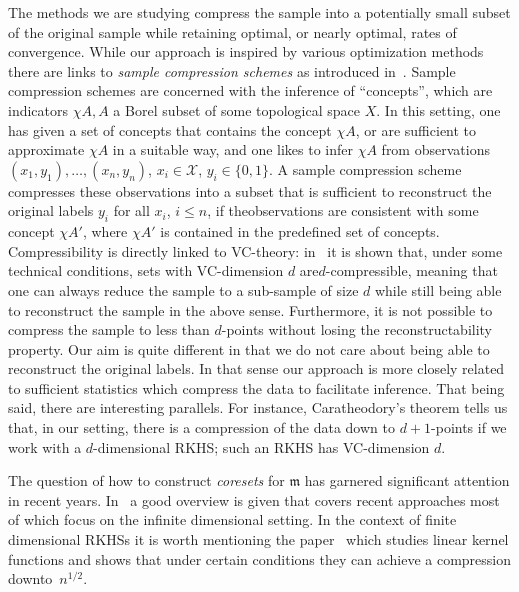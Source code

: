 \documentclass[10pt]{amsart}
\theoremstyle{definition}\newtheorem{defi}[theo]{Definition}\newtheorem{rema}[theo]{Remark}\newtheorem{exam}[theo]{Example}\newtheorem{exem}[theo]{Example}\newtheorem{nota}[theo]{Notation}
\theoremstyle{remark}
\newcommand{\X}{\mathcal{X}}
\newcommand{\mean}{\mathfrak{m}}
\begin{document}
The methods we are studying compress the sample into a potentially small subset of the original sample while retaining optimal, or nearly optimal, rates of convergence. While our approach is inspired by various optimization methods there are links to \emph{sample compression schemes} as introduced in~\cite{FLOYD95,LITTLE86}. Sample compression schemes are concerned with the inference of ``concepts'', which are indicators $\chi A, A$ a Borel subset of some topological space $X$. In this setting, one has given a set of concepts that contains the concept $\chi A$, or are sufficient to approximate $\chi A$ in a suitable way, and one likes to infer $\chi A$ from observations $(x_1,y_1), \dots, (x_n,y_n)$, $x_i \in \X$, $y_i \in \{0,1\}$. A sample compression scheme compresses these observations into a subset that is sufficient to reconstruct the original labels $y_i$ for all $x_i$, $i\leq n$, if the\linebreak observations are consistent with some concept $\chi A'$, where $\chi A'$ is contained in the predefined set of concepts. Compressibility is directly linked to VC-theory: in~\cite{FLOYD95} it is shown that, under some technical conditions, sets with VC-dimension $d$ are\linebreak $d$-compressible, meaning that one can always reduce the sample to a sub-sample of size $d$ while still being able to reconstruct the sample in the above sense. Furthermore, it is not possible to compress the sample to less than $d$-points without losing the reconstructability property. Our aim is quite different in that we do not care about being able to reconstruct the original labels. In that sense our approach is more closely related to sufficient statistics which compress the data to facilitate inference. That being said, there are interesting parallels. For instance, Caratheodory's theorem tells us that, in our setting, there is a compression of the data down to $d+1$-points if we work with a $d$-dimensional RKHS; such an RKHS has VC-dimension $d$.

The question of how to construct \emph{coresets} for $\mean$ has garnered significant attention in recent years. In~\cite{DWI21} a good overview is given that covers recent approaches most of which focus on the infinite dimensional setting. In the context of finite dimensional RKHSs it is worth mentioning the paper~\cite{HARV14} which studies linear kernel functions and shows that under certain conditions they can achieve a compression down\linebreak to~$n^{1/2}$.
\end{document}
